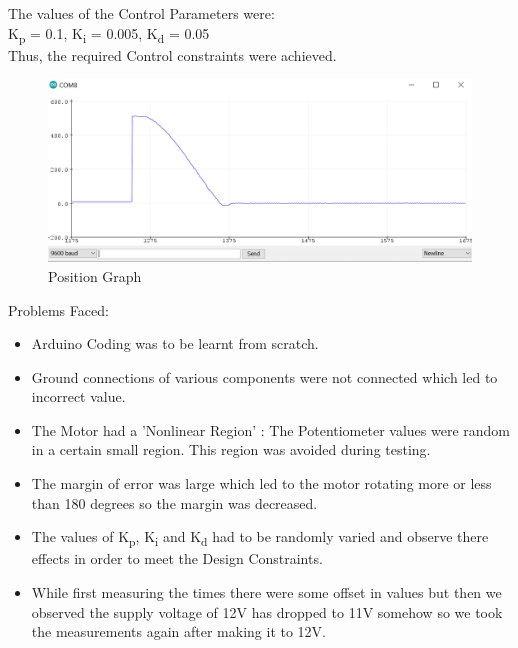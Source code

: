\documentclass[12pt]{report}
\begin{document}
The values of the Control Parameters were: \\

\hspace{150pt} K\textsubscript{p} = 0.1,  K\textsubscript{i} = 0.005, K\textsubscript{d} = 0.05\\

Thus, the required Control constraints were achieved.\\


\begin{figure}[h!]
\center
\includegraphics[width=425pt]{Graph1.png}
\caption{Position Graph}
\end{figure}

\newpage

\begin{Large}
Problems Faced: \\
\end{Large}

\begin{itemize}
\item Arduino Coding was to be learnt from scratch.
\item Ground connections of various components were not connected which led to incorrect value.
\item The Motor had a 'Nonlinear Region' : The Potentiometer values were random in a certain small region. This region was avoided during testing.
\item The margin of error was large which led to the motor rotating more or less than 180 degrees so the margin was decreased.
\item The values of K\textsubscript{p}, K\textsubscript{i} and K\textsubscript{d} had to be randomly varied and observe there effects in order to meet the Design Constraints.
\item While first measuring the times there were some offset in values but then we observed the supply voltage of 12V has dropped to 11V somehow so we took the measurements again after making it to 12V.
\end{itemize} 
\end{document}
